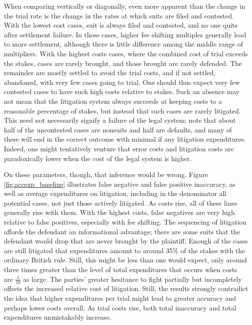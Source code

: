 \documentclass{article}
\begin{document}
When comparing vertically or diagonally, even more apparent than the change in the trial rate is the change in the rates at which suits are filed and contested.  With the lowest cost cases, suit is always filed and contested, and no one quits after settlement failure. In these cases, higher fee shifting multiples generally lead to more settlement, although there is little difference among the middle range of multipliers. With the highest costs cases, where the combined cost of trial exceeds the stakes, cases are rarely brought, and those brought are rarely defended. The remainder are mostly settled to avoid the trial costs, and if not settled, abandoned, with very few cases going to trial. One should thus expect very few contested cases to have such high costs relative to stakes. Such an absence may not mean that the litigation system always succeeds at keeping costs to a reasonable percentage of stakes, but instead that such cases are rarely litigated. This need not necessarily signify a failure of the legal system; note that about half of the uncontested cases are nonsuits and half are defaults, and many of these will end in the correct outcome with minimal if any litigation expenditures. Indeed, one might tentatively venture that error costs and litigation costs are paradoxically lower when the cost of the legal system is higher. 

On these parameters, though, that inference would be wrong. Figure \ref{fig:accexp_baseline} illustrates false negative and false positive inaccuracy, as well as average expenditures on litigation, including in the denominator all potential cases, not just those actively litigated. As costs rise, all of these lines generally rise with them. With the highest costs, false negatives are very high relative to false positives, especially with fee shifting. The sequencing of litigation affords the defendant an informational advantage; there are some suits that the defendant would drop that are never brought by the plaintiff. Enough of the cases are still litigated that expenditures amount to around 35\% of the stakes with the ordinary British rule. Still, this might be less than one would expect, only around three times greater than the level of total expenditures that occurs when costs are $\frac{1}{16}$ as large. The parties' greater hesitance to fight partially but incompletely offsets the increased relative cost of litigation. Still, the results strongly contradict the idea that higher expenditures per trial might lead to greater accuracy and perhaps lower costs overall. As trial costs rise, both total inaccuracy and total expenditures unmistakably increase.
\end{document}
